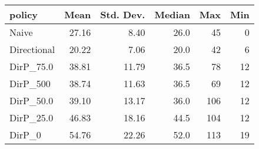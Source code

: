 \begin{tabular}{lrrrrr}
\toprule
     policy &  Mean &  Std. Dev. &  Median &  Max &  Min \\
\midrule
      Naive & 27.16 &       8.40 &    26.0 &   45 &    0 \\
Directional & 20.22 &       7.06 &    20.0 &   42 &    6 \\
  DirP\_75.0 & 38.81 &      11.79 &    36.5 &   78 &   12 \\
   DirP\_500 & 38.74 &      11.63 &    36.5 &   69 &   12 \\
  DirP\_50.0 & 39.10 &      13.17 &    36.0 &  106 &   12 \\
  DirP\_25.0 & 46.83 &      18.16 &    44.5 &  104 &   12 \\
     DirP\_0 & 54.76 &      22.26 &    52.0 &  113 &   19 \\
\bottomrule
\end{tabular}
